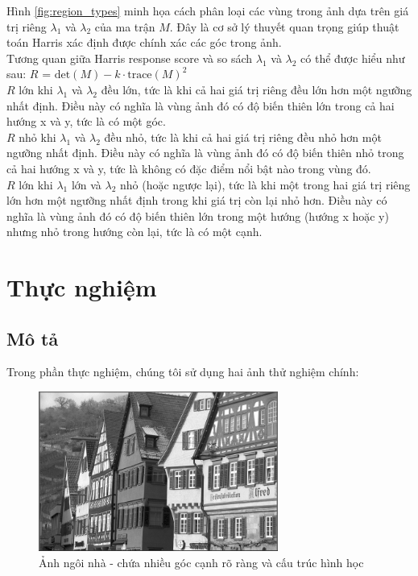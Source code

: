 \documentclass[12pt]{article}
\begin{document}
Hình \ref{fig:region_types} minh họa cách phân loại các vùng trong ảnh dựa trên giá trị riêng $\lambda_1$ và $\lambda_2$ của ma trận $M$. Đây là cơ sở lý thuyết quan trọng giúp thuật toán Harris xác định được chính xác các góc trong ảnh.\\
Tương quan giữa Harris response score và so sách $\lambda_1$ và $\lambda_2$ có thể được hiểu như sau:
$R$ = $\text{det}(M) - k \cdot \text{trace}(M)^2$\\
$R$ lớn khi $\lambda_1$ và $\lambda_2$ đều lớn, tức là khi cả hai giá trị riêng đều lớn hơn một ngưỡng nhất định. Điều này có nghĩa là vùng ảnh đó có độ biến thiên lớn trong cả hai hướng x và y, tức là có một góc.\\
$R$ nhỏ khi $\lambda_1$ và $\lambda_2$ đều nhỏ, tức là khi cả hai giá trị riêng đều nhỏ hơn một ngưỡng nhất định. Điều này có nghĩa là vùng ảnh đó có độ biến thiên nhỏ trong cả hai hướng x và y, tức là không có đặc điểm nổi bật nào trong vùng đó.\\
$R$ lớn khi $\lambda_1$ lớn và $\lambda_2$ nhỏ (hoặc ngược lại), tức là khi một trong hai giá trị riêng lớn hơn một ngưỡng nhất định trong khi giá trị còn lại nhỏ hơn. Điều này có nghĩa là vùng ảnh đó có độ biến thiên lớn trong một hướng (hướng x hoặc y) nhưng nhỏ trong hướng còn lại, tức là có một cạnh.
\section{Thực nghiệm}

\subsection{Mô tả}
Trong phần thực nghiệm, chúng tôi sử dụng hai ảnh thử nghiệm chính:


\begin{figure}[H]
    \centering
    \includegraphics[width=0.7\textwidth]{img/test.jpg}
    \caption{Ảnh ngôi nhà - chứa nhiều góc cạnh rõ ràng và cấu trúc hình học}
    \label{fig:houses}
\end{figure}
\end{document}
